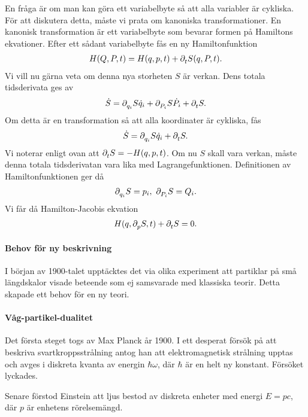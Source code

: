 En fråga är om man kan göra ett variabelbyte så att alla variabler är cykliska. För att diskutera detta, måste vi prata om kanoniska transformationer. En kanonisk transformation är ett variabelbyte som bevarar formen på Hamiltons ekvationer. Efter ett sådant variabelbyte fås en ny Hamiltonfunktion
\begin{align*}
	H(Q, P, t) = H(q, p, t) + \partial_{t}^{}S(q, P, t).
\end{align*}
Vi vill nu gärna veta om denna nya storheten $S$ är verkan. Dens totala tidsderivata ges av
\begin{align*}
	\dot{S} = \partial_{q_{i}}^{}S\dot{q}_{i} + \partial_{P_{i}}^{}S\dot{P}_{i} + \partial_{t}^{}S.
\end{align*}
Om detta är en transformation så att alla koordinater är cykliska, fås
\begin{align*}
	\dot{S} = \partial_{q_{i}}^{}S\dot{q}_{i} + \partial_{t}^{}S.
\end{align*}
Vi noterar enligt ovan att $\partial_{t}^{}S = - H(q, p, t)$. Om nu $S$ skall vara verkan, måste denna totala tidsderivatan vara lika med Lagrangefunktionen. Definitionen av Hamiltonfunktionen ger då
\begin{align*}
	\partial_{q_{i}}^{}S = p_{i},\ \partial_{P_{i}}^{}S = Q_{i}.
\end{align*}
Vi får då Hamilton-Jacobis ekvation
\begin{align*}
	H(q, \partial_{p}^{}S, t) + \partial_{t}^{}S = 0.
\end{align*}

\paragraph{Behov för ny beskrivning}
I början av 1900-talet upptäcktes det via olika experiment att partiklar på små längdskalor visade beteende som ej samsvarade med klassiska teorir. Detta skapade ett behov för en ny teori.

\paragraph{Våg-partikel-dualitet}
Det första steget togs av Max Planck år 1900. I ett desperat försök på att beskriva svartkroppsstrålning antog han att elektromagnetisk strålning upptas och avges i diskreta kvanta av energin $\hbar\omega$, där $\hbar$ är en helt ny konstant. Försöket lyckades.

Senare förstod Einstein att ljus bestod av diskreta enheter med energi $E = pc$, där $p$ är enhetens rörelsemängd.

